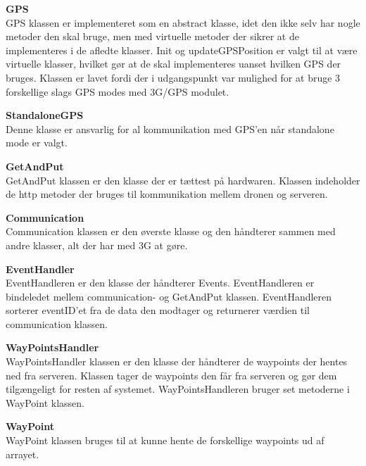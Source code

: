 \newpage

\textbf{GPS} \\
GPS klassen er implementeret som en abstract klasse, idet den ikke selv har nogle metoder den skal bruge, men med virtuelle metoder der sikrer at de implementeres i de afledte klasser. 
Init og updateGPSPosition er valgt til at være virtuelle klasser, hvilket gør at de skal implementeres uanset hvilken GPS der bruges. Klassen er lavet fordi der i udgangspunkt var mulighed for at bruge 3 forskellige slags GPS modes med 3G/GPS modulet. 

\textbf{StandaloneGPS}\\
Denne klasse er ansvarlig for al kommunikation med GPS'en når standalone mode er valgt. 

\textbf{GetAndPut} \\
GetAndPut klassen er den klasse der er tættest på hardwaren. Klassen indeholder de http metoder der bruges til kommunikation mellem dronen og serveren. 

\textbf{Communication} \\
Communication klassen er den øverste klasse og den håndterer sammen med andre klasser, alt der har med 3G at gøre.

\textbf{EventHandler} \\
EventHandleren er den klasse der håndterer Events. EventHandleren er bindeledet mellem communication- og GetAndPut klassen. EventHandleren sorterer eventID'et fra de data den modtager og returnerer værdien til communication klassen.

\textbf{WayPointsHandler} \\
WayPointsHandler klassen er den klasse der håndterer de waypoints der hentes ned fra serveren. Klassen tager de waypoints den får fra serveren og gør dem tilgængeligt for resten af systemet. WayPointsHandleren bruger set metoderne i WayPoint klassen.

\textbf{WayPoint} \\
WayPoint klassen bruges til at kunne hente de forskellige waypoints ud af arrayet.  

\newpage


